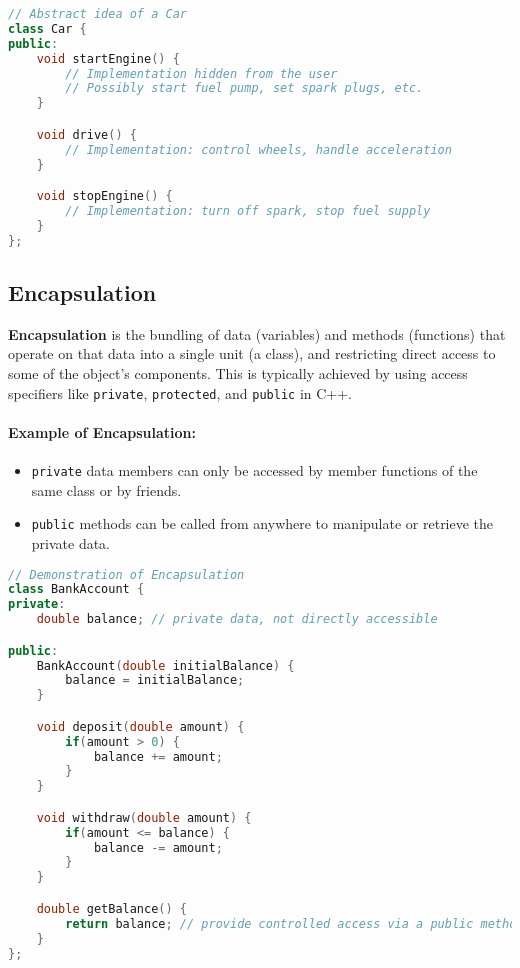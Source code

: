 \documentclass[a4paper,12pt]{article}
\begin{document}
\begin{lstlisting}[language=C++]
// Abstract idea of a Car
class Car {
public:
    void startEngine() {
        // Implementation hidden from the user
        // Possibly start fuel pump, set spark plugs, etc.
    }

    void drive() {
        // Implementation: control wheels, handle acceleration
    }

    void stopEngine() {
        // Implementation: turn off spark, stop fuel supply
    }
};
\end{lstlisting}

\subsection{Encapsulation}
\textbf{Encapsulation} is the bundling of data (variables) and methods (functions) that operate on that data into a single unit (a class), and restricting direct access to some of the object's components. This is typically achieved by using access specifiers like \texttt{private}, \texttt{protected}, and \texttt{public} in C++.

\paragraph{Example of Encapsulation:}
\begin{itemize}
    \item \texttt{private} data members can only be accessed by member functions of the same class or by friends.
    \item \texttt{public} methods can be called from anywhere to manipulate or retrieve the private data.
\end{itemize}

\begin{lstlisting}[language=C++]
// Demonstration of Encapsulation
class BankAccount {
private:
    double balance; // private data, not directly accessible

public:
    BankAccount(double initialBalance) {
        balance = initialBalance;
    }

    void deposit(double amount) {
        if(amount > 0) {
            balance += amount; 
        }
    }

    void withdraw(double amount) {
        if(amount <= balance) {
            balance -= amount;
        }
    }

    double getBalance() {
        return balance; // provide controlled access via a public method
    }
};
\end{lstlisting}
\end{document}
